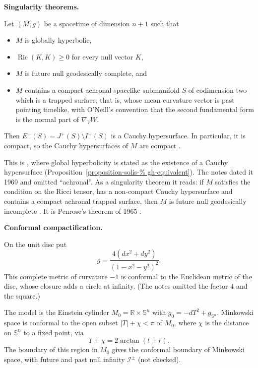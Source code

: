 \medskip\noindent
{\bf Singularity theorems.}

\begin{theorem}[Penrose]
\label{theorem-solis-penrose}
Let $(M,g)$ be a spacetime of dimension
$n+1$ such that
\begin{itemize}
\item $M$ is globally hyperbolic,
\item $\operatorname{Ric}(K,K)\geq 0$ for
every null vector $K$,
\item $M$ is future null geodesically
complete, and
\item $M$ contains a compact achronal
spacelike submanifold $S$ of codimension
two which is a trapped surface, that is,
whose mean curvature vector is past
pointing timelike, with O'Neill's
convention that the second fundamental
form is the normal part of
$\nabla_VW$.
\end{itemize}
Then
$E^+(S)=J^+(S)\setminus I^+(S)$ is a
Cauchy hypersurface. In particular, it is
compact, so the Cauchy hypersurfaces of
$M$ are compact
\cite[Corollary 14.32]{oneill}.
\end{theorem}

\noindent
This is \cite[Theorem 14.61]{oneill},
where global hyperbolicity is stated as
the existence of a Cauchy hypersurface
(Proposition~\ref{proposition-solis-%
gh-equivalent}).
The notes dated it 1969 and omitted
``achronal''. As a singularity theorem it
reads: if $M$ satisfies the condition on
the Ricci tensor, has a non-compact
Cauchy hypersurface and contains a
compact achronal trapped surface, then
$M$ is future null geodesically
incomplete \cite[Theorem 14.61,
Corollary A]{oneill}. It is Penrose's
theorem of 1965 \cite{penrose1965collapse}.

\medskip\noindent
{\bf Conformal compactification.}

\begin{example}
\label{example-solis-poincare-disc}
On the unit disc put
$$
g=\frac{4\left(dx^2+dy^2\right)}
{\left(1-x^2-y^2\right)^2}.
$$
This complete metric of curvature $-1$ is
conformal to the Euclidean metric of the
disc, whose closure adds a circle at
infinity. (The notes omitted the factor
$4$ and the square.)
\end{example}

\begin{example}
\label{example-solis-einstein-cylinder}
The model is the Einstein cylinder
$M_0=\mathbb{R}\times\mathbb{S}^n$ with
$g_0=-dT^2+g_{\mathbb{S}^n}$. Minkowski
space is conformal to the open subset
$|T|+\chi<\pi$ of $M_0$, where $\chi$ is
the distance on $\mathbb{S}^n$ to a fixed
point, via
$$
T\pm\chi=2\arctan(t\pm r).
$$
The boundary of this region in $M_0$
gives the conformal boundary of Minkowski
space, with future and past null infinity
$\mathcal{I}^{\pm}$ (not checked).
\end{example}


